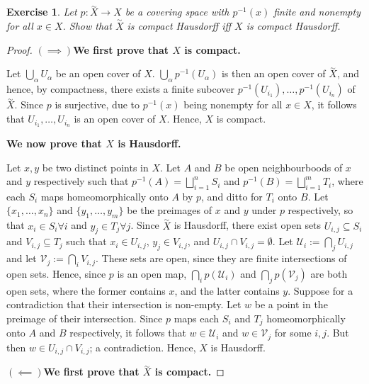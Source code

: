 \documentclass{article}
\newtheorem{exercise}{Exercise}[subsection]
\begin{document}
\begin{exercise}
Let $p:\overset{\sim}{X}\to X$ be a covering space with $p^{-1}(x)$ finite and nonempty for all $x\in X$. Show that $\overset{\sim}{X}$ is compact Hausdorff iff $X$ is compact Hausdorff.
\end{exercise}
\begin{proof}
$(\implies)$\textbf{We first prove that $X$ is compact.}

\noindent Let $\bigcup_\alpha U_\alpha$ be an open cover of $X$. $\bigcup_\alpha p^{-1}(U_\alpha)$ is then an open cover of $\overset{\sim}{X}$, and hence, by compactness, there exists a finite subcover $p^{-1}(U_{i_1}),\dots,p^{-1}(U_{i_n})$ of $\overset{\sim}{X}$. Since $p$ is surjective, due to $p^{-1}(x)$ being nonempty for all $x\in X$, it follows that $U_{i_1},\dots, U_{i_n}$ is an open cover of $X$. Hence, $X$ is compact.

\noindent\textbf{We now prove that $X$ is Hausdorff.}

\noindent Let $x,y$ be two distinct points in $X$. Let $A$ and $B$ be open neighbourboods of $x$ and $y$ respectively such that $p^{-1}(A)=\bigsqcup_{i=1}^nS_i$ and $p^{-1}(B)=\bigsqcup_{i=1}^mT_i$, where each $S_i$ maps homeomorphically onto $A$ by $p$, and ditto for $T_i$ onto $B$. Let $\{x_1,\dots, x_n\}$ and $\{y_1,\dots, y_m\}$ be the preimages of $x$ and $y$ under $p$ respectively, so that $x_i\in S_i\forall i$ and $y_j\in T_j\forall j$. Since $\overset{\sim}{X}$ is Hausdorff, there exist open sets $U_{i,j}\subseteq S_i$ and $V_{i,j}\subseteq T_j$ such that $x_i\in U_{i,j}$, $y_j\in V_{i,j}$, and $U_{i,j}\cap V_{i,j}=\emptyset$. Let $\mathcal{U}_i:=\bigcap_{j}U_{i,j}$ and let $\mathcal{V}_j:=\bigcap_{i}V_{i,j}$. These sets are open, since they are finite intersections of open sets. Hence, since $p$ is an open map, $\bigcap_ip(\mathcal{U}_i)$ and $\bigcap_jp(\mathcal{V}_j)$ are both open sets, where the former contains $x$, and the latter contains $y$. Suppose for a contradiction that their intersection is non-empty. Let $w$ be a point in the preimage of their intersection. Since $p$ maps each $S_i$ and $T_j$ homeomorphically onto $A$ and $B$ respectively, it follows that $w\in\mathcal{U}_i$ and $w\in\mathcal{V}_j$ for some $i,j$. But then $w\in U_{i,j}\cap V_{i,j}$; a contradiction. Hence, $X$ is Hausdorff.

\noindent $(\impliedby)$\textbf{We first prove that $\overset{\sim}{X}$ is compact.}


\end{proof}
\end{document}
